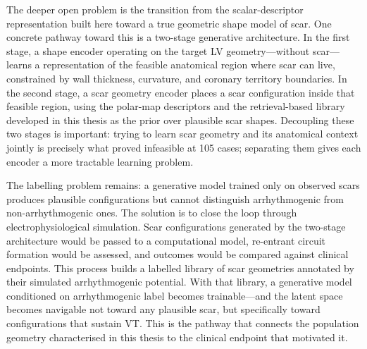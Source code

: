 The deeper open problem is the transition from the scalar-descriptor representation built
here toward a true geometric shape model of scar. One concrete pathway toward this is a
two-stage generative architecture. In the first stage, a shape encoder operating on the target
LV geometry---without scar---learns a representation of the feasible anatomical region where
scar can live, constrained by wall thickness, curvature, and coronary territory boundaries. In
the second stage, a scar geometry encoder places a scar configuration inside that feasible
region, using the polar-map descriptors and the retrieval-based library developed in this
thesis as the prior over plausible scar shapes. Decoupling these two stages is important:
trying to learn scar geometry and its anatomical context jointly is precisely what proved
infeasible at 105 cases; separating them gives each encoder a more tractable learning
problem.

The labelling problem remains: a generative model trained only on observed scars produces
plausible configurations but cannot distinguish arrhythmogenic from non-arrhythmogenic
ones. The solution is to close the loop through electrophysiological simulation. Scar
configurations generated by the two-stage architecture would be passed to a computational
model, re-entrant circuit formation would be assessed, and outcomes would be compared
against clinical endpoints. This process builds a labelled library of scar
geometries annotated by their simulated arrhythmogenic potential. With that library, a
generative model conditioned on arrhythmogenic label becomes trainable---and the latent
space becomes navigable not toward any plausible scar, but specifically toward
configurations that sustain VT. This is the pathway that connects the population geometry
characterised in this thesis to the clinical endpoint that motivated it.

